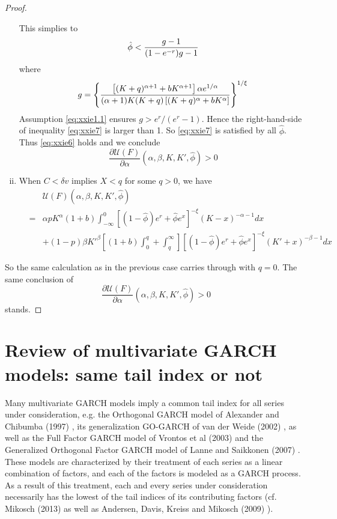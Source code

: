 \documentclass{article}
\newcommand{\pd}[2]{
  \frac{\partial #1}{\partial #2}
}
\newcommand{\1}[1]{
  \mathbf{1}_{\{#1\}}
}
\begin{document}
\begin{proof}
\begin{enumerate}[i.]
    This simplies to
    \begin{equation}
      \label{eq:xxie7}
      \hat\phi < {
        g - 1
        \over
        (1 - e^{-r}) g - 1
      }
    \end{equation}
    where
    \[
    g = 
    \left\{
      {
        \left[
          (K + q)^{\alpha + 1} + b K^{\alpha + 1}
        \right] \alpha e^{1/\alpha}
        \over
        (\alpha + 1) K (K + q) 
        \left[
          (K + q)^{\alpha} + b K^{\alpha}
        \right]
      }
    \right\}^{1/\xi}
    \]
    Assumption \eqref{eq:xxie1.1} ensures $g > e^r/(e^r - 1)$. Hence the
    right-hand-side of inequality \eqref{eq:xxie7} is larger than 1.
    So \eqref{eq:xxie7} is satisfied by all $\hat\phi$. Thus
    \eqref{eq:xxie6} holds and we conclude
    \[
    \pd{\mathcal U(F)}{\alpha}(\alpha, \beta, K, K', \hat \phi) > 0
    \]

  \item When $C < \delta v$ implies $X < q$ for some $q > 0$, we have
    \begin{eqnarray*}
      && \mathcal U(F)(\alpha, \beta, K, K', \hat\phi) \\
      &=& \alpha p K^\alpha (1 + b) \int_{-\infty}^0
      [(1 - \hat\phi) e^r + \hat\phi e^x]^{-\xi}
      (K - x)^{-\alpha-1} dx \\
      &&
      + (1 - p) \beta K'^\beta \left[
        (1 + b) \int_0^q + \int_q^\infty
      \right]
      [(1 - \hat\phi) e^r + \hat\phi e^x]^{-\xi} (K' + x)^{-\beta-1} dx    
    \end{eqnarray*}
  \end{enumerate}
  So the same calculation as in the previous case carries through
  with $q = 0$. The same conclusion of
  \[
  \pd{\mathcal U(F)}{\alpha}(\alpha, \beta, K, K', \hat \phi) > 0
  \]
  stands.
\end{proof}

\section{Review of multivariate GARCH models:
  same tail index or not}
Many multivariate GARCH models imply a common tail index for all
series under consideration, e.g. the Orthogonal GARCH model of
Alexander and Chibumba (1997) \cite{alexander1997multivariate}, its
generalization GO-GARCH of van der Weide (2002) \cite{van2002go}, as
well as the Full Factor GARCH model of Vrontos et al (2003)
\cite{vrontos2003full} and the Generalized Orthogonal Factor GARCH
model of Lanne and Saikkonen (2007) \cite{lanne2007modeling}. These
models are characterized by their treatment of each series as a linear
combination of factors, and each of the factors is modeled as a GARCH
process. As a result of this treatment, each and every series under
consideration necessarily has the lowest of the tail indices of its
contributing factors (cf. Mikosch (2013) \cite{Mikosch2013} as well
as Andersen, Davis, Kreiss and Mikosch (2009)
\cite{andersen2009handbook}).
\end{document}
